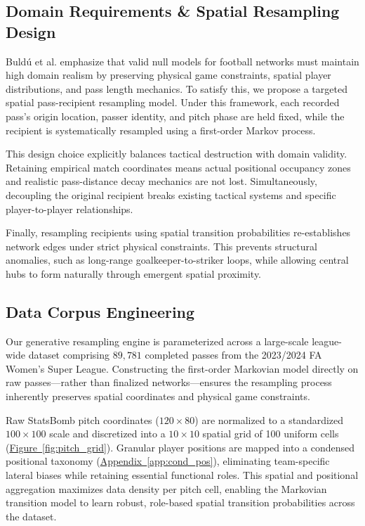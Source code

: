 \documentclass[12pt, a4paper]{article}
\begin{document}
\subsection{Domain Requirements \& Spatial Resampling Design}
\label{subsec:domain_resampling_design}

Buld{\'u} et al. \cite{buldu2018} emphasize that valid null models for football networks must maintain high domain realism by preserving physical game constraints, spatial player distributions, and pass length mechanics. To satisfy this, we propose a targeted spatial pass-recipient resampling model. Under this framework, each recorded pass's origin location, passer identity, and pitch phase are held fixed, while the recipient is systematically resampled using a first-order Markov process.

This design choice explicitly balances tactical destruction with domain validity. Retaining empirical match coordinates means actual positional occupancy zones and realistic pass-distance decay mechanics are not lost. Simultaneously, decoupling the original recipient breaks existing tactical systems and specific player-to-player relationships.

Finally, resampling recipients using spatial transition probabilities re-establishes network edges under strict physical constraints. This prevents structural anomalies, such as long-range goalkeeper-to-striker loops, while allowing central hubs to form naturally through emergent spatial proximity.

\subsection{Data Corpus Engineering}
\label{subsec:data_corpus_engineering}

Our generative resampling engine is parameterized across a large-scale league-wide dataset comprising $89,781$ completed passes from the 2023/2024 FA Women's Super League. Constructing the first-order Markovian model directly on raw passes---rather than finalized networks---ensures the resampling process inherently preserves spatial coordinates and physical game constraints.

Raw StatsBomb pitch coordinates ($120 \times 80$) are normalized to a standardized $100 \times 100$ scale and discretized into a $10 \times 10$ spatial grid of 100 uniform cells (\hyperref[fig:pitch_grid]{Figure~\ref{fig:pitch_grid}}). Granular player positions are mapped into a condensed positional taxonomy (\hyperref[app:cond_pos]{Appendix~\ref{app:cond_pos}}), eliminating team-specific lateral biases while retaining essential functional roles. This spatial and positional aggregation maximizes data density per pitch cell, enabling the Markovian transition model to learn robust, role-based spatial transition probabilities across the dataset.
\end{document}
